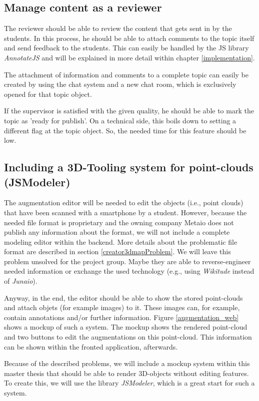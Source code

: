 \subsection{Manage content as a reviewer}
The reviewer should be able to review the content that gets sent in by the students. In this process, he should be able to attach comments to the topic itself and send feedback to the students. This can easily be handled by the \ac{JS} library \emph{AnnotateJS} and will be explained in more detail within chapter \ref{implementation}.

The attachment of information and comments to a complete topic can easily be created by using the chat system and a new chat room, which is exclusively opened for that topic object. 

If the supervisor is satisfied with the given quality, he should be able to mark the topic as 'ready for publish'. On a technical side, this boils down to setting a different flag at the topic object. So, the needed time for this feature should be low.

\subsection{Including a 3D-Tooling system for point-clouds (JSModeler)}
\label{modelingObjects}
The augmentation editor will be needed to edit the objects (i.e., point clouds) that have been scanned with a smartphone by a student. However, because the needed file format is proprietary and the owning company Metaio does not publish any information about the format, we will not include a complete modeling editor within the backend. More details about the problematic file format are described in section \ref{creator3dmapProblem}. We will leave this problem unsolved for the project group. Maybe they are able to reverse-engineer needed information or exchange the used technology (e.g., using \emph{Wikitude} instead of \emph{Junaio}).

Anyway, in the end, the editor should be able to show the stored point-clouds and attach objets (for example images) to it. These images can, for example, contain annotations and/or further information. Figure \ref{augmentation_web} shows a mockup of such a system. The mockup shows the rendered point-cloud and two buttons to edit the augmentations on this point-cloud. This information can be shown within the fronted application, afterwards.

Because of the described problems, we will include a mockup system within this master thesis that should be able to render 3D-objects without editing features. To create this, we will use the library \emph{JSModeler}, which is a great start for such a system.

